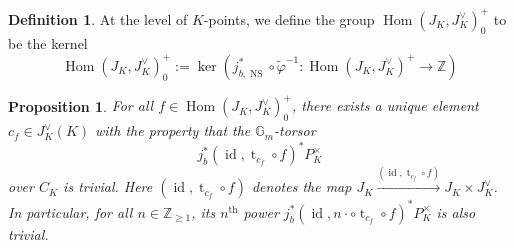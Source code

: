 \documentclass[11pt,oneside]{amsart}
\theoremstyle{plain}
\newtheorem{proposition}[theorem]{Proposition}
\theoremstyle{definition}
\newtheorem{definition}[theorem]{Definition}
\def\G{{\bf G}}
\DeclareMathOperator{\NS}{NS}
\DeclareMathOperator{\id}{id} \DeclareMathOperator{\Sel}{Sel}
\DeclareMathOperator{\Hom}{Hom}
\DeclareMathOperator{\tr}{t}
\def\Z{\mathbb{Z}}
\def\C{\mathbb{C}}
\def\G{\mathbb{G}}
\def\ra{\rightarrow}
\begin{document}
\begin{definition} 
At the level of $K$-points, we define the group $\Hom(J_K, J_K^\vee)_0^+$ to be the kernel 
$$
\Hom(J_K, J_K^\vee)_0^+ := \ker \left( j_{b, \NS}^*\circ \tilde{\varphi}^{-1}: \Hom(J_K, J_K^\vee)^+ \ra \Z \right) 
$$ %
\end{definition}

\begin{proposition}\label{prop:trivtorsor}
For all $f\in \Hom(J_K, J_K^\vee)_0^+$, there exists a unique element $c_f\in J_K^\vee(K)$ with the property that the $\G_m$-torsor
$$
j_b^*(\id, \tr_{c_f}\circ f)^* P_K^\times
$$ 
over $C_K$ is trivial. Here $(\id, \tr_{c_f} \circ f)$ denotes the map $J_K \xrightarrow{(\id, \tr_{c_f} \circ f)} J_K \times J_K^\vee$. 
In particular, for all $n\in\Z_{\ge 1}$, its $n^\text{th}$ power $j_b^*(\id, n\cdot \circ \tr_{c_f}\circ f)^* P_K^\times$ is also trivial. 
\end{proposition}
\end{document}

